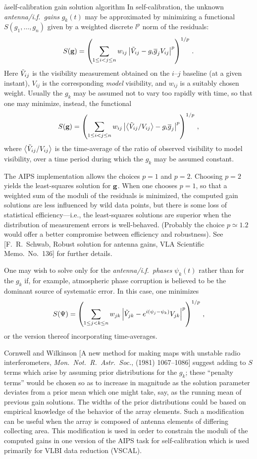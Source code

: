 \aa{self-calibration gain solution algorithm}
In self-calibration,
the unknown {\it antenna/i.f.\ gains} $g_k(t)$ may be approximated
by minimizing a functional $S(g_1,\dots,g_n)$
given by a weighted discrete $l^p$ norm of the residuals:
$$S(\bold g)=
\left(\sum_{1\le i<j\le n}w_{ij}\left|\s V_{ij}-g_i\overline g_j
V_{ij}\right|^p\right)^{1/p}\,.$$
Here $\s V_{ij}$ is the visibility measurement obtained on the $i$--$j$
baseline (at a given instant),
$V_{ij}$ is the corresponding {\sl model} visibility,
and $w_{ij}$ is a suitably chosen weight.
Usually the $g_k$ may be assumed not to vary too rapidly with
time, so that one may minimize, instead, the functional
$$S(\bold g)=
\left(\sum_{1\le i<j\le n}w_{ij}\left|\left<\s V_{ij}/V_{ij}\right>
-g_i\overline g_j\right|^p\right)^{1/p}\,,$$
where $\left<\s V_{ij}/V_{ij}\right>$ is the time-average of the
ratio of observed visibility to model visibility, over a time
period during which the $g_k$ may be assumed constant.
\par
The AIPS implementation allows the choices $p=1$ and $p=2$.
Choosing $p=2$ yields the least-squares solution for $\bold g$.
When one chooses $p=1$, so that a weighted sum of the moduli
of the residuals is minimized, the computed gain solutions
are less influenced by wild data points, but there is some loss
of statistical efficiency---i.e., the least-squares solutions
are superior when the distribution of measurement errors is
well-behaved.
(Probably the choice $p\simeq1.2$ would offer a better compromise
between efficiency and robustness).
See [F.~R.~Schwab, Robust solution for antenna gains,
VLA Scientific Memo.\ No.~136] for further details.
\par
One may wish to solve only for the {\it antenna/i.f.\ phases}
$\psi_k(t)$ rather than for the $g_k$
if, for example, atmospheric phase corruption is believed to
be the dominant source of systematic error.
In this case, one minimizes
$$S(\Psi)=
\left(\sum_{1\le j<k\le n}w_{jk}\left|\s V_{jk}-
e^{i(\psi_j-\psi_k)}
V_{jk}\right|^p\right)^{1/p}\,,$$
or the version thereof incorporating time-averages.
\par
Cornwell and Wilkinson
[A new method for making maps with unstable radio interferometers,
{\it Mon.\ Not.\ R.\ Astr.\ Soc.},  (1981) 1067--1086]
suggest adding to $S$ terms which arise by assuming prior
distributions for the $g_k$;
these ``penalty terms'' would be chosen so as to increase in magnitude
as the solution parameter deviates from a prior mean
which one might take, say, as the running mean of previous gain solutions.
The widths of the prior distributions could be based on empirical
knowledge of the behavior of the array elements.
Such a modification can be useful when the
array is composed of antenna elements of differing collecting area.
This modification is used in order to constrain the moduli
of the computed gains in one version of the AIPS task for
self-calibration which is used primarily for VLBI data reduction
(VSCAL).

